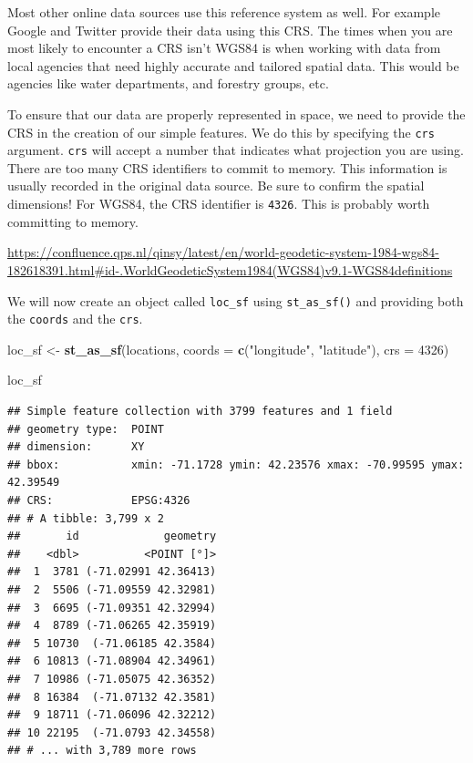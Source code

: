 \documentclass[
]{book}
\newenvironment{Shaded}{\begin{snugshade}}{\end{snugshade}}
\newcommand{\DataTypeTok}[1]{\textcolor[rgb]{0.13,0.29,0.53}{#1}}
\newcommand{\DecValTok}[1]{\textcolor[rgb]{0.00,0.00,0.81}{#1}}
\newcommand{\KeywordTok}[1]{\textcolor[rgb]{0.13,0.29,0.53}{\textbf{#1}}}
\newcommand{\NormalTok}[1]{#1}
\newcommand{\StringTok}[1]{\textcolor[rgb]{0.31,0.60,0.02}{#1}}
\begin{document}
Most other online data sources use this reference system as well. For example Google and Twitter provide their data using this CRS. The times when you are most likely to encounter a CRS isn't WGS84 is when working with data from local agencies that need highly accurate and tailored spatial data. This would be agencies like water departments, and forestry groups, etc.

To ensure that our data are properly represented in space, we need to provide the CRS in the creation of our simple features. We do this by specifying the \texttt{crs} argument. \texttt{crs} will accept a number that indicates what projection you are using. There are too many CRS identifiers to commit to memory. This information is usually recorded in the original data source. Be sure to confirm the spatial dimensions! For WGS84, the CRS identifier is \texttt{4326}. This is probably worth committing to memory.

\url{https://confluence.qps.nl/qinsy/latest/en/world-geodetic-system-1984-wgs84-182618391.html\#id-.WorldGeodeticSystem1984(WGS84)v9.1-WGS84definitions}

We will now create an object called \texttt{loc\_sf} using \texttt{st\_as\_sf()} and providing both the \texttt{coords} and the \texttt{crs}.

\begin{Shaded}
\begin{Highlighting}[]
\NormalTok{loc\_sf \textless{}{-}}\StringTok{ }\KeywordTok{st\_as\_sf}\NormalTok{(locations,}
         \DataTypeTok{coords =} \KeywordTok{c}\NormalTok{(}\StringTok{"longitude"}\NormalTok{, }\StringTok{"latitude"}\NormalTok{),}
         \DataTypeTok{crs =} \DecValTok{4326}\NormalTok{)}

\NormalTok{loc\_sf}
\end{Highlighting}
\end{Shaded}

\begin{verbatim}
## Simple feature collection with 3799 features and 1 field
## geometry type:  POINT
## dimension:      XY
## bbox:           xmin: -71.1728 ymin: 42.23576 xmax: -70.99595 ymax: 42.39549
## CRS:            EPSG:4326
## # A tibble: 3,799 x 2
##       id             geometry
##    <dbl>          <POINT [°]>
##  1  3781 (-71.02991 42.36413)
##  2  5506 (-71.09559 42.32981)
##  3  6695 (-71.09351 42.32994)
##  4  8789 (-71.06265 42.35919)
##  5 10730  (-71.06185 42.3584)
##  6 10813 (-71.08904 42.34961)
##  7 10986 (-71.05075 42.36352)
##  8 16384  (-71.07132 42.3581)
##  9 18711 (-71.06096 42.32212)
## 10 22195  (-71.0793 42.34558)
## # ... with 3,789 more rows
\end{verbatim}
\end{document}
